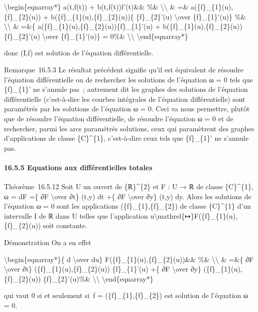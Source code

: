 \documentclass[]{article}
\begin{document}
\textbackslash{}begin\{eqnarray*\} a(t,f(t)) + b(t,f(t))f'(t)\&\& \%\&
\textbackslash{}\textbackslash{} \& =\&
a(\{f\}\_\{1\}(u),\{f\}\_\{2\}(u)) +
b(\{f\}\_\{1\}(u),\{f\}\_\{2\}(u))\{ \{f\}\_\{2\}'(u)
\textbackslash{}over \{f\}\_\{1\}'(u)\} \%\&
\textbackslash{}\textbackslash{} \& =\&\{
a(\{f\}\_\{1\}(u),\{f\}\_\{2\}(u))\{f\}\_\{1\}'(u) +
b(\{f\}\_\{1\}(u),\{f\}\_\{2\}(u))\{f\}\_\{2\}'(u) \textbackslash{}over
\{f\}\_\{1\}'(u)\} = 0\%\& \textbackslash{}\textbackslash{}
\textbackslash{}end\{eqnarray*\}

donc (I,f) est solution de l'équation différentielle.

Remarque~16.5.3 Le résultat précédent signifie qu'il est équivalent de
résoudre l'équation différentielle ou de rechercher les solutions de
l'équation ω = 0 tels que \{f\}\_\{1\}' ne s'annule pas~; autrement dit
les graphes des solutions de l'équation différentielle (c'est-à-dire les
courbes intégrales de l'équation différentielle) sont paramétrés par les
solutions de l'équation ω = 0. Ceci va nous permettre, plutôt que de
résoudre l'équation différentielle, de résoudre l'équation ω = 0 et de
rechercher, parmi les arcs paramétrés solutions, ceux qui paramètrent
des graphes d'applications de classe \{C\}\^{}\{1\}, c'est-à-dire ceux
tels que \{f\}\_\{1\}' ne s'annule pas.

\paragraph{16.5.5 Equations aux différentielles totales}

Théorème~16.5.12 Soit U un ouvert de \{ℝ\}\^{}\{2\} et F : U → ℝ de
classe \{C\}\^{}\{1\}, ω = dF =\{ ∂F \textbackslash{}over ∂t\} (t,y) dt
+\{ ∂F \textbackslash{}over ∂y\} (t,y) dy. Alors les solutions de
l'équation ω = 0 sont les applications (\{f\}\_\{1\},\{f\}\_\{2\}) de
classe \{C\}\^{}\{1\} d'un intervalle I de ℝ dans U telles que
l'application
u\textbackslash{}mathrel\{↦\}F(\{f\}\_\{1\}(u),\{f\}\_\{2\}(u)) soit
constante.

Démonstration On a en effet

\textbackslash{}begin\{eqnarray*\}\{ d \textbackslash{}over du\}
F(\{f\}\_\{1\}(u),\{f\}\_\{2\}(u))\&\& \%\&
\textbackslash{}\textbackslash{} \& =\&\{ ∂F \textbackslash{}over ∂t\}
(\{f\}\_\{1\}(u),\{f\}\_\{2\}(u)) \{f\}\_\{1\}'(u) +\{ ∂F
\textbackslash{}over ∂y\} (\{f\}\_\{1\}(u),\{f\}\_\{2\}(u))
\{f\}\_\{2\}'(u)\%\& \textbackslash{}\textbackslash{}
\textbackslash{}end\{eqnarray*\}

qui vaut 0 si et seulement si~f = (\{f\}\_\{1\},\{f\}\_\{2\}) est
solution de l'équation ω = 0.
\end{document}
